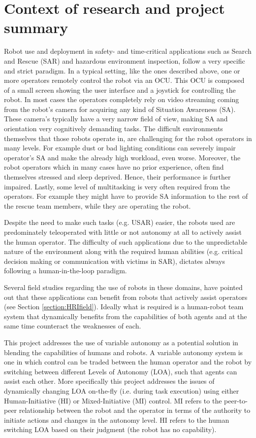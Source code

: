 \documentclass[a4paper,12pt,oneside,openright]{bhamthesis}
\begin{document}
\section{Context of research and project summary}
Robot use and deployment in safety- and time-critical applications such as Search and Rescue (SAR) and hazardous environment inspection, follow a very specific and strict paradigm. In a typical setting, like the ones described above, one or more operators remotely control the robot via an OCU. This OCU is composed of a small screen showing the user interface and a joystick for controlling the robot. In most cases the operators completely rely on video streaming coming from the robot's camera for acquiring any kind of Situation Awareness (SA). These camera's typically have a very narrow field of view, making SA and orientation very cognitively demanding tasks.  
The difficult environments themselves that those robots operate in, are challenging for the robot operators in many levels. For example dust or bad lighting conditions can severely impair operator's SA and make the already high workload, even worse. Moreover, the robot operators which in many cases have no prior experience, often find themselves stressed and sleep deprived. Hence, their performance is further impaired. Lastly, some level of multitasking is very often required from the operators. For example they might have to provide SA information to the rest of the rescue team members, while they are operating the robot. 

Despite the need to make such tasks (e.g. USAR) easier, the robots used are predominately teleoperated with little or not autonomy at all to actively assist the human operator. The difficulty of such applications due to the unpredictable nature of the environment along with the required human abilities (e.g. critical decision making or communication with victims in SAR), dictates always following a human-in-the-loop paradigm.

Several field studies regarding the use of robots in these domains, have pointed out that these applications can benefit from robots that actively assist operators (see Section \ref{section:HRIfield}). Ideally what is required is a human-robot team system that dynamically benefits from the capabilities of both agents and at the same time counteract the weaknesses of each.

This project addresses the use of variable autonomy as a potential solution in blending the capabilities of humans and robots. A variable autonomy system is one in which control can be traded between the human operator and the robot by switching between different Levels of Autonomy (LOA), such that agents can assist each other. More specifically this project addresses the issues of dynamically changing LOA on-the-fly (i.e. during task execution) using either Human-Initiative (HI) or Mixed-Initiative (MI) control. MI refers to the peer-to-peer relationship between the robot and the operator in terms of the authority to initiate actions and changes in the autonomy level. HI refers to the human switching LOA based on their judgment (the robot has no capability).
\end{document}
